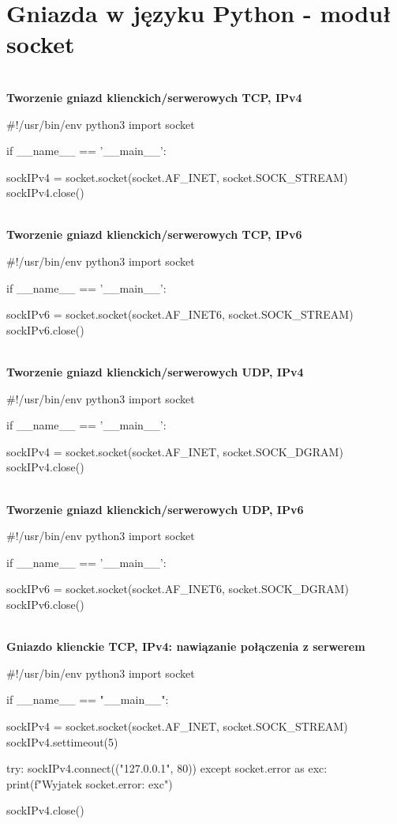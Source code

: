 \section*{Gniazda w języku Python - moduł socket} \mbox{}\\

\noindent \textbf{Tworzenie gniazd klienckich/serwerowych TCP, IPv4}

\begin{code}
#!/usr/bin/env python3
import socket

if __name__ == '__main__':

	sockIPv4 = socket.socket(socket.AF_INET, socket.SOCK_STREAM)
	sockIPv4.close()
\end{code} \mbox{}\\

\noindent \textbf{Tworzenie gniazd klienckich/serwerowych TCP, IPv6}

\begin{code}
#!/usr/bin/env python3
import socket

if __name__ == '__main__':

	sockIPv6 = socket.socket(socket.AF_INET6, socket.SOCK_STREAM)
	sockIPv6.close()
\end{code} \mbox{}\\

\noindent \textbf{Tworzenie gniazd klienckich/serwerowych UDP, IPv4}

\begin{code}
#!/usr/bin/env python3
import socket 

if __name__ == '__main__':

	sockIPv4 = socket.socket(socket.AF_INET,  socket.SOCK_DGRAM)
	sockIPv4.close()
\end{code}\mbox{}\\

\noindent \textbf{Tworzenie gniazd klienckich/serwerowych UDP, IPv6}

\begin{code}
#!/usr/bin/env python3
import socket 

if __name__ == '__main__':

	sockIPv6 = socket.socket(socket.AF_INET6,  socket.SOCK_DGRAM)
	sockIPv6.close()
\end{code}\mbox{}\\

\newpage
\noindent \textbf{Gniazdo klienckie TCP, IPv4: nawiązanie połączenia z serwerem}

\begin{code}
#!/usr/bin/env python3
import socket

if __name__ == "__main__":

    sockIPv4 = socket.socket(socket.AF_INET, socket.SOCK_STREAM)
    sockIPv4.settimeout(5)

    try:
        sockIPv4.connect(("127.0.0.1", 80))
    except socket.error as exc:
        print(f"Wyjatek socket.error: {exc}")

    sockIPv4.close()
\end{code}\mbox{}\\


